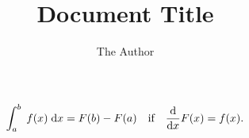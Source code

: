 \documentclass{article}
\title{Document Title}
\author{The Author}
\begin{document}
\maketitle
\begin{equation}
	\int_a^b\;f(x)\;\mathrm{d}x = F(b) - F(a) \quad\text{if}\quad \diff{F(x)}{x} = f(x).
\end{equation}
\end{document}

